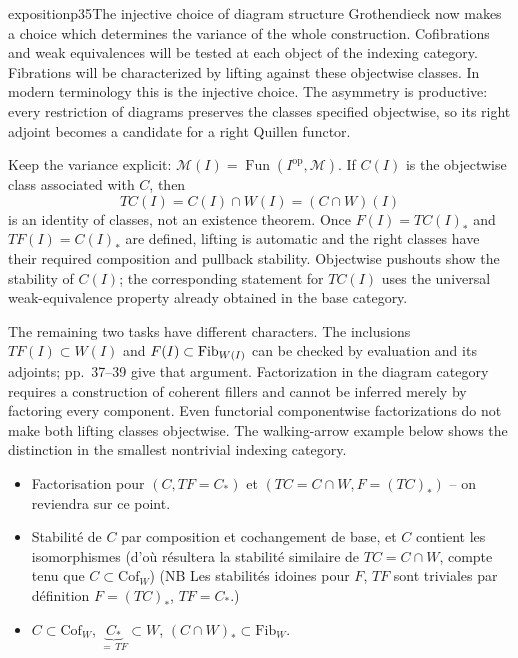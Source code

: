 \begin{dcomment}{exposition}{p35}{The injective choice of diagram structure}
Grothendieck now makes a choice which determines the variance of the whole construction. Cofibrations and weak equivalences will be tested at each object of the indexing category. Fibrations will be characterized by lifting against these objectwise classes. In modern terminology this is the injective choice. The asymmetry is productive: every restriction of diagrams preserves the classes specified objectwise, so its right adjoint becomes a candidate for a right Quillen functor.

Keep the variance explicit: $\mathcal M(I)=\operatorname{Fun}(I^{\mathrm{op}},\mathcal M)$. If $C(I)$ is the objectwise class associated with $C$, then
\[
 TC(I)=C(I)\cap W(I)=(C\cap W)(I)
\]
is an identity of classes, not an existence theorem. Once $F(I)=TC(I)_*$ and $TF(I)=C(I)_*$ are defined, lifting is automatic and the right classes have their required composition and pullback stability. Objectwise pushouts show the stability of $C(I)$; the corresponding statement for $TC(I)$ uses the universal weak-equivalence property already obtained in the base category.

The remaining two tasks have different characters. The inclusions $TF(I)\subset W(I)$ and $F(I)\subset\mathrm{Fib}_{W(I)}$ can be checked by evaluation and its adjoints; pp.~37--39 give that argument. Factorization in the diagram category requires a construction of coherent fillers and cannot be inferred merely by factoring every component. Even functorial componentwise factorizations do not make both lifting classes objectwise. The walking-arrow example below shows the distinction in the smallest nontrivial indexing category.
\end{dcomment}


\begin{itemize}[leftmargin=3em]
\item[\circled{i}] Factorisation pour $(C, TF=C_*)$ et $(TC=C\cap W, F=(TC)_*)$ – on reviendra sur ce point.
\item[\circled{ii}] Stabilité de $C$ par composition et cochangement de base, et $C$ contient les isomorphismes (d'où résultera la stabilité similaire de $TC = C\cap W$, compte tenu que $C\subset\mathrm{Cof}_W$) (NB Les stabilités idoines pour $F$, $TF$ sont triviales par définition $F=(TC)_*$, $TF=C_*$.)
\item[\circled{iii}] $C\subset\mathrm{Cof}_W$, $\underbrace{C_*}_{=\,TF}\subset W$, $(C\cap W)_*\subset\mathrm{Fib}_W$.
\end{itemize}

